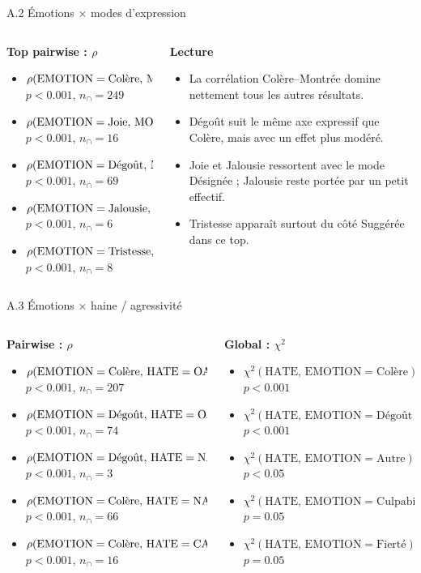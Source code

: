 \documentclass[aspectratio=169,10pt,xcolor=table]{beamer}
\newcommand{\pval}[1]{\ensuremath{#1}}
\newcommand{\pos}[1]{\textcolor{Positive}{#1}}
\newcommand{\negcorr}[1]{\textcolor{Negative}{#1}}
\newcommand{\rhoitem}[7]{\item \(\rho(\mathrm{#1}=\text{#2},\,\mathrm{#3}=\text{#4}) = #5\)\\[-0.15em]{\tiny \(p\pval{#6}\), \(n_{\cap}=#7\)}}
\newcommand{\chiitem}[5]{\item \(\chi^2(\mathrm{#1},\,\mathrm{#2}=\text{#3}) = #4\)\\[-0.15em]{\tiny \(p\pval{#5}\)}}
\begin{document}
\begin{frame}{A.2 Émotions × modes d'expression}
\scriptsize
\begin{columns}[T,onlytextwidth]
\begin{column}{0.54\textwidth}
\textbf{Top pairwise : \(\rho\)}
\begin{itemize}
\setlength\itemsep{0.55em}
\rhoitem{EMOTION}{Colère}{MODE}{Montrée}{\pos{0.75}}{<0.001}{249}
\rhoitem{EMOTION}{Joie}{MODE}{Désignée}{\pos{0.36}}{<0.001}{16}
\rhoitem{EMOTION}{Dégoût}{MODE}{Montrée}{\pos{0.33}}{<0.001}{69}
\rhoitem{EMOTION}{Jalousie}{MODE}{Désignée}{\pos{0.32}}{<0.001}{6}
\rhoitem{EMOTION}{Tristesse}{MODE}{Suggérée}{\pos{0.27}}{<0.001}{8}
\end{itemize}
\end{column}
\begin{column}{0.42\textwidth}
\textbf{Lecture}
\begin{itemize}
\setlength\itemsep{0.55em}
  \item La corrélation Colère--Montrée domine nettement tous les autres résultats.
  \item Dégoût suit le même axe expressif que Colère, mais avec un effet plus modéré.
  \item Joie et Jalousie ressortent avec le mode Désignée ; Jalousie reste portée par un petit effectif.
  \item Tristesse apparaît surtout du côté Suggérée dans ce top.
\end{itemize}
\end{column}
\end{columns}
\end{frame}

\begin{frame}{A.3 Émotions × haine / agressivité}
\scriptsize
\begin{columns}[T,onlytextwidth]
\begin{column}{0.49\textwidth}
\textbf{Pairwise : \(\rho\)}
\begin{itemize}
\setlength\itemsep{0.55em}
\rhoitem{EMOTION}{Colère}{HATE}{OAG}{\pos{0.26}}{<0.001}{207}
\rhoitem{EMOTION}{Dégoût}{HATE}{OAG}{\pos{0.26}}{<0.001}{74}
\rhoitem{EMOTION}{Dégoût}{HATE}{NAG}{\negcorr{-0.21}}{<0.001}{3}
\rhoitem{EMOTION}{Colère}{HATE}{NAG}{\negcorr{-0.17}}{<0.001}{66}
\rhoitem{EMOTION}{Colère}{HATE}{CAG}{\negcorr{-0.15}}{<0.001}{16}
\end{itemize}
\end{column}
\begin{column}{0.49\textwidth}
\textbf{Global : \(\chi^2\)}
\begin{itemize}
\setlength\itemsep{0.55em}
\chiitem{HATE}{EMOTION}{Colère}{55.13}{<0.001}
\chiitem{HATE}{EMOTION}{Dégoût}{51.78}{<0.001}
\chiitem{HATE}{EMOTION}{Autre}{7.54}{<0.05}
\chiitem{HATE}{EMOTION}{Culpabilité}{6.00}{=0.05}
\chiitem{HATE}{EMOTION}{Fierté}{6.00}{=0.05}
\end{itemize}
\end{column}
\end{columns}
\end{frame}
\end{document}
